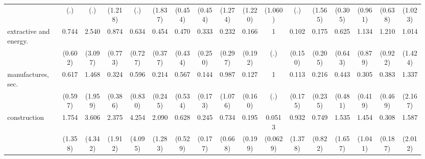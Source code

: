 {\begin{tabular}{l*{16}{c}}
                    &         (.)         &         (.)         &     (1.218)         &         (.)         &     (1.837)         &     (0.454)         &     (0.454)         &     (1.274)         &     (1.220)         &     (1.060)         &         (.)         &     (1.565)         &     (0.305)         &     (0.961)         &     (0.638)         &     (1.023)         \\
[1em]
extractive and energy.&       0.744         &       2.540         &       0.874         &       0.634         &       0.454         &       0.470         &       0.333         &       0.232         &       0.166         &           1         &       0.102         &       0.175         &       0.625         &       1.134         &       1.210         &       1.014         \\
                    &     (0.602)         &     (3.097)         &     (0.773)         &     (0.727)         &     (0.377)         &     (0.434)         &     (0.250)         &     (0.297)         &     (0.192)         &         (.)         &     (0.150)         &     (0.205)         &     (0.643)         &     (0.879)         &     (0.922)         &     (1.424)         \\
[1em]
manufactures, sec.  &       0.617         &       1.468         &       0.324         &       0.596         &       0.214         &       0.567         &       0.144         &       0.987         &       0.127         &           1         &       0.113         &       0.216         &       0.443         &       0.305         &       0.383         &       1.337         \\
                    &     (0.597)         &     (1.959)         &     (0.386)         &     (0.830)         &     (0.245)         &     (0.534)         &     (0.173)         &     (1.076)         &     (0.160)         &         (.)         &     (0.175)         &     (0.235)         &     (0.481)         &     (0.419)         &     (0.469)         &     (2.167)         \\
[1em]
construction        &       1.754         &       3.606         &       2.375         &       4.254         &       2.090         &       0.628         &       0.245         &       0.734         &       0.195         &      0.0513\sym{*}  &       0.932         &       0.749         &       1.535         &       1.454         &       0.308         &       1.587         \\
                    &     (1.358)         &     (4.342)         &     (1.912)         &     (4.095)         &     (1.283)         &     (0.529)         &     (0.177)         &     (0.668)         &     (0.199)         &    (0.0629)         &     (1.378)         &     (0.822)         &     (1.657)         &     (1.041)         &     (0.187)         &     (2.012)         \\

\end{tabular}}

